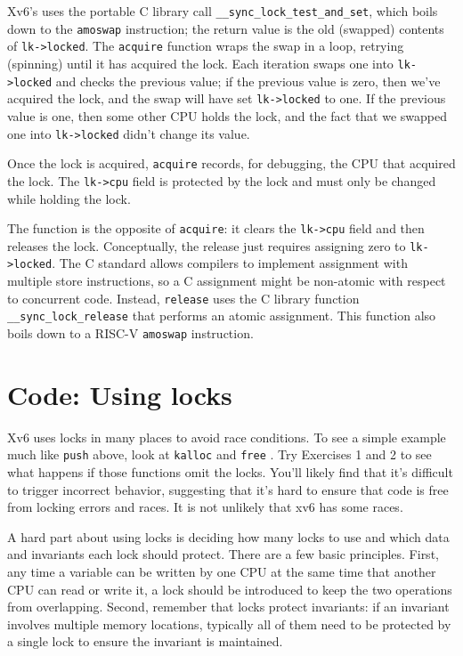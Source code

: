 Xv6's 
uses the portable C library call 
\lstinline{__sync_lock_test_and_set},
which boils down to the
\lstinline{amoswap}
instruction;
the return value is the old (swapped) contents of
\lstinline{lk->locked}.
The
\lstinline{acquire}
function wraps the swap in a loop, retrying (spinning) until it has
acquired the lock.
Each iteration swaps one into
\lstinline{lk->locked} 
and checks the previous value;
if the previous value is zero, then we've acquired the
lock, and the swap will have set 
\lstinline{lk->locked}
to one.
If the previous value is one, then some other CPU
holds the lock, and the fact that we swapped one into
\lstinline{lk->locked}
didn't change its value.

Once the lock is acquired,
\lstinline{acquire}
records, for debugging, the CPU 
that acquired the lock.
The
\lstinline{lk->cpu}
field is protected by the lock
and must only be changed while holding the lock.

The function
is the opposite of 
\lstinline{acquire}:
it clears the 
\lstinline{lk->cpu}
field
and then releases the lock.
Conceptually, the release just requires assigning zero to
\lstinline{lk->locked}.
The C standard allows compilers to implement assignment
with multiple store instructions,
so a C assignment might be non-atomic with respect
to concurrent code.
Instead,
\lstinline{release}
uses the C library function
\lstinline{__sync_lock_release}
that performs an atomic assignment.
This function also boils down to a RISC-V
\lstinline{amoswap}
instruction.
\section{Code: Using locks}
Xv6 uses locks in many places to avoid race conditions.
To see a simple example much like
\lstinline{push}
above,
look at
\lstinline{kalloc}
and
\lstinline{free}
.
Try Exercises 1 and 2 to see what happens if those
functions omit the locks.
You'll likely find that it's difficult to trigger incorrect
behavior, suggesting that it's hard to ensure that code
is free from locking errors and races.
It is not unlikely that xv6 has some races.

A hard part about using locks is deciding how many locks
to use and which data and invariants each lock should protect.
There are a few basic principles.
First, any time a variable can be written by one CPU
at the same time that another CPU can read or write it,
a lock should be introduced to keep the two
operations from overlapping.
Second, remember that locks protect invariants:
if an invariant involves multiple memory locations,
typically all of them need to be protected
by a single lock to ensure the invariant is maintained.

